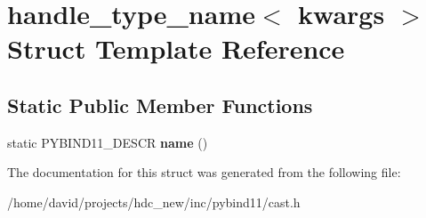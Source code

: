 \hypertarget{structhandle__type__name_3_01kwargs_01_4}{}\section{handle\+\_\+type\+\_\+name$<$ kwargs $>$ Struct Template Reference}
\label{structhandle__type__name_3_01kwargs_01_4}
\subsection*{Static Public Member Functions}
\begin{DoxyCompactItemize}
\item 
static P\+Y\+B\+I\+N\+D11\+\_\+\+D\+E\+S\+CR {\bfseries name} ()\hypertarget{structhandle__type__name_3_01kwargs_01_4_ab19d8a1dedcaee09bf506483a53447d2}{}\label{structhandle__type__name_3_01kwargs_01_4_ab19d8a1dedcaee09bf506483a53447d2}

\end{DoxyCompactItemize}


The documentation for this struct was generated from the following file\+:\begin{DoxyCompactItemize}
\item 
/home/david/projects/hdc\+\_\+new/inc/pybind11/cast.\+h\end{DoxyCompactItemize}
